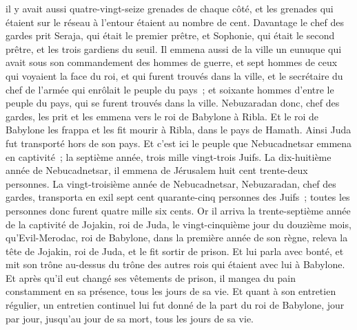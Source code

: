 \begin{multicols}{2}
il y avait aussi quatre-vingt-seize grenades de chaque côté, et les grenades qui étaient sur le réseau à l'entour étaient au nombre de cent.
Davantage le chef des gardes prit Seraja, qui était le premier prêtre, et Sophonie, qui était le second prêtre, et les trois gardiens du seuil.
Il emmena aussi de la ville un eunuque qui avait sous son commandement des hommes de guerre, et sept hommes de ceux qui voyaient la face du roi, et qui furent trouvés dans la ville, et le secrétaire du chef de l'armée qui enrôlait le peuple du pays~; et soixante hommes d'entre le peuple du pays, qui se furent trouvés dans la ville.
Nebuzaradan donc, chef des gardes, les prit et les emmena vers le roi de Babylone à Ribla.
Et le roi de Babylone les frappa et les fit mourir à Ribla, dans le pays de Hamath. Ainsi Juda fut transporté hors de son pays.
Et c'est ici le peuple que Nebucadnetsar emmena en captivité~; la septième année, trois mille vingt-trois Juifs.
La dix-huitième année de Nebucadnetsar, il emmena de Jérusalem huit cent trente-deux personnes.
La vingt-troisième année de Nebucadnetsar, Nebuzaradan, chef des gardes, transporta en exil sept cent quarante-cinq personnes des Juifs~; toutes les personnes donc furent quatre mille six cents.
Or il arriva la trente-septième année de la captivité de Jojakin, roi de Juda, le vingt-cinquième jour du douzième mois, qu'Evil-Merodac, roi de Babylone, dans la première année de son règne, releva la tête de Jojakin, roi de Juda, et le fit sortir de prison.
Et lui parla avec bonté, et mit son trône au-dessus du trône des autres rois qui étaient avec lui à Babylone.
Et après qu'il eut changé ses vêtements de prison, il mangea du pain constamment en sa présence, tous les jours de sa vie.
Et quant à son entretien régulier, un entretien continuel lui fut donné de la part du roi de Babylone, jour par jour, jusqu'au jour de sa mort, tous les jours de sa vie.
\PPE{}
\end{multicols}
